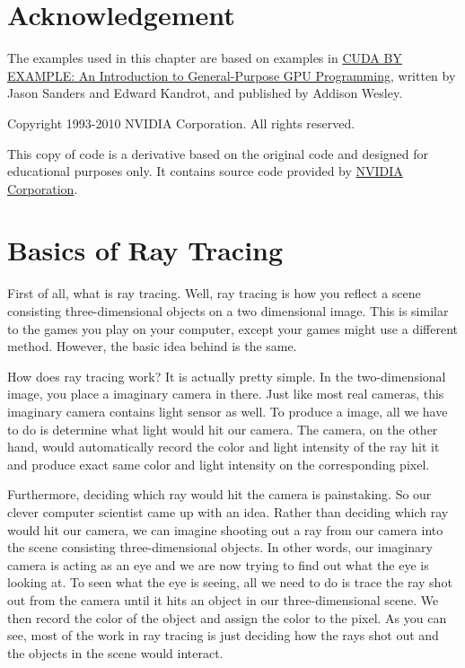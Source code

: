 \documentclass[letterpaper,10pt,openany,oneside]{sphinxmanual}
\begin{document}
\section{Acknowledgement}
\label{RTACM/RTACM:acknowledgement}
The examples used in this chapter are based on examples in \href{http://developer.nvidia.com/content/cuda-example-introduction-general-purpose-gpu-programming-0}{CUDA BY EXAMPLE: An Introduction to General-Purpose GPU Programming}, written by Jason Sanders and Edward Kandrot, and published by Addison Wesley.

Copyright 1993-2010 NVIDIA Corporation.  All rights reserved.

This copy of code is a derivative based on the original code and designed for educational purposes only. It contains source code provided by \href{http://www.nvidia.com}{NVIDIA Corporation}.


\section{Basics of Ray Tracing}
\label{RTACM/RTACM:nvidia-corporation}\label{RTACM/RTACM:basics-of-ray-tracing}
First of all, what is ray tracing. Well, ray tracing is how you reflect a scene consisting three-dimensional objects on a two dimensional image. This is similar to the games you play on your computer, except your games might use a different method. However, the basic idea behind is the same.

How does ray tracing work? It is actually pretty simple. In the two-dimensional image, you place a imaginary camera in there. Just like most real cameras, this imaginary camera contains light sensor as well. To produce a image, all we have to do is determine what light would hit our camera. The camera, on the other hand, would automatically record the color and light intensity of the ray hit it and produce exact same color and light intensity on the corresponding pixel.

Furthermore, deciding which ray would hit the camera is painstaking. So our clever computer scientist came up with an idea. Rather than deciding which ray would hit our camera, we can imagine shooting out a ray from our camera into the scene consisting three-dimensional objects. In other words, our imaginary camera is acting as an eye and we are now trying to find out what the eye is looking at. To seen what the eye is seeing, all we need to do is trace the ray shot out from the camera until it hits an object in our three-dimensional scene. We then record the color of the object and assign the color to the pixel. As you can see, most of the work in ray tracing is just deciding how the rays shot out and the objects in the scene would interact.
\end{document}
